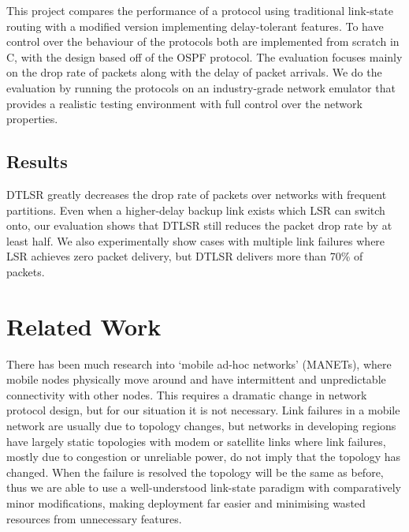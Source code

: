 \documentclass[withindex,glossary,openany]{cam-thesis}
\begin{document}
This project compares the performance of a protocol using traditional link-state routing with a modified version implementing delay-tolerant features. To have control over the behaviour of the protocols both are implemented from scratch in C, with the design based off of the OSPF protocol. The evaluation focuses mainly on the drop rate of packets along with the delay of packet arrivals. We do the evaluation by running the protocols on an industry-grade network emulator that provides a realistic testing environment with full control over the network properties.

\subsection{Results}

DTLSR greatly decreases the drop rate of packets over networks with frequent partitions. Even when a higher-delay backup link exists which LSR can switch onto, our evaluation shows that DTLSR still reduces the packet drop rate by at least half. We also experimentally show cases with multiple link failures where LSR achieves zero packet delivery, but DTLSR delivers more than 70\% of packets.

\section{Related Work}

There has been much research into `mobile ad-hoc networks' (MANETs), where mobile nodes physically move around and have intermittent and unpredictable connectivity with other nodes. This requires a dramatic change in network protocol design, but for our situation it is not necessary. Link failures in a mobile network are usually due to topology changes, but networks in developing regions have largely static topologies with modem or satellite links where link failures, mostly due to congestion or unreliable power, do not imply that the topology has changed. When the failure is resolved the topology will be the same as before, thus we are able to use a well-understood link-state paradigm with comparatively minor modifications, making deployment far easier and minimising wasted resources from unnecessary features.
\end{document}
